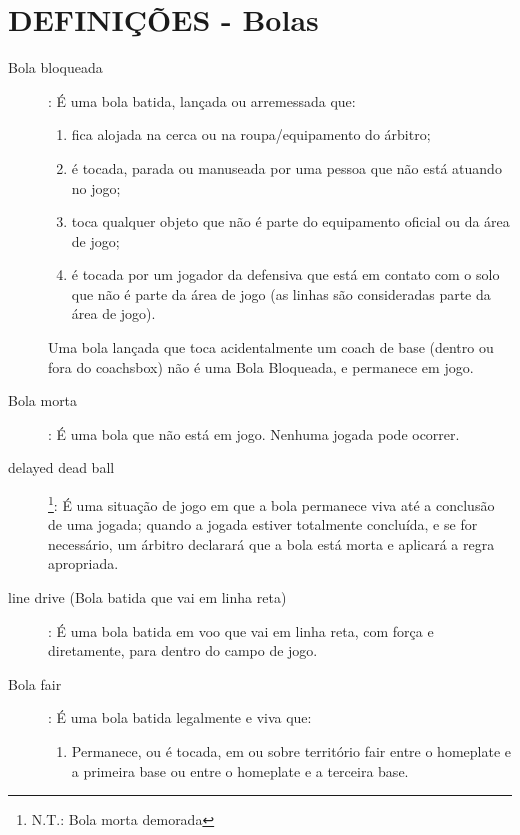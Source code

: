 	\section{DEFINI\c{C}\~OES - Bolas}
	\begin{description}	
	\item[Bola bloqueada]: \'E uma bola batida, lan\c{c}ada ou arremessada que: 
	
	\begin{enumerate}[label=\alph*)]
		\item fica alojada na cerca ou na roupa/equipamento do \'arbitro; 
		
		\item  \'e tocada, parada ou manuseada por uma pessoa que n\~ao est\'a atuando no jogo; 
		
		\item  toca qualquer objeto que n\~ao \'e parte do equipamento oficial ou da \'area de jogo; 
		
		\item  \'e tocada por um jogador da defensiva que est\'a em contato com o solo que n\~ao \'e parte da \'area de jogo (as linhas s\~ao consideradas parte da \'area de jogo).
		
	\end{enumerate}
	Uma bola lan\c{c}ada que toca acidentalmente um \gls{coach} de base (dentro ou fora do \gls{coachsbox}) n\~ao \'e uma Bola Bloqueada, e permanece em jogo. 
	
	\item[Bola morta]: \'E uma bola que n\~ao est\'a em jogo. Nenhuma jogada pode ocorrer. 
	
	\item[\Gls{delayed dead ball}]\footnote{N.T.: Bola morta demorada}: \'E uma situa\c{c}\~ao de jogo em que a bola permanece viva at\'e a conclus\~ao de uma jogada; quando a jogada estiver totalmente conclu\'ida, e se for necess\'ario, um \'arbitro declarar\'a que a bola est\'a morta e aplicar\'a a regra apropriada. 
	
	\item[\gls{line drive} (Bola batida que vai em linha reta)]: \'E uma bola batida em voo que vai em linha reta, com for\c{c}a e diretamente, para dentro do campo de jogo. 
	
	\item[Bola \gls{fair}]: \'E uma bola batida legalmente e viva que: 
	
	\begin{enumerate}[label=\alph*)]
		\item Permanece, ou \'e tocada, em ou sobre territ\'orio \gls{fair} entre o \gls{homeplate} e a primeira base ou entre o \gls{homeplate} e a terceira base. 
		

\end{enumerate}
\end{description}
